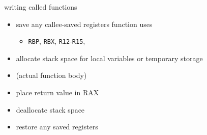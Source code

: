 \begin{frame}{writing called functions}
\begin{itemize}
\item save any callee-saved registers function uses
    \begin{itemize}
    \item \texttt{RBP}, \texttt{RBX}, \texttt{R12}-\texttt{R15}, 
    \end{itemize}
\item allocate stack space for local variables or temporary storage
\item (actual function body)
\item place return value in RAX
\item deallocate stack space
\item restore any saved registers
\end{itemize}
\end{frame}

